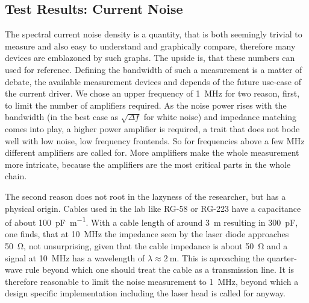 \clearpage
\subsection{Test Results: Current Noise}
\label{sec:results_current_noise}
The spectral current noise density is a quantity, that is both seemingly trivial to measure and also easy to understand and graphically compare, therefore many devices are emblazoned by such graphs. The upside is, that these numbers can used for reference. Defining the bandwidth of such a measurement is a matter of debate, the available measurement devices and depends of the future use-case of the current driver. We chose an upper frequency of \qty{1}{\MHz} for two reason, first, to limit the number of amplifiers required. As the noise power rises with the bandwidth (in the best case as $\sqrt{\Delta f}$ for white noise) and impedance matching comes into play, a higher power amplifier is required, a trait that does not bode well with low noise, low frequency frontends. So for frequencies above a few \unit{\MHz} different amplifiers are called for. More amplifiers make the whole measurement more intricate, because the amplifiers are the most critical parts in the whole chain.

The second reason does not root in the lazyness of the researcher, but has a physical origin. Cables used in the lab like RG-58 or RG-223 have a capacitance of about \qty{100}{\pF \per \m}. With a cable length of around \qty{3}{\m} resulting in \qty{300}{\pF}, one finds, that at \qty{10}{\MHz} the impedance seen by the laser diode approaches \qty{50}{\ohm}, not unsurprising, given that the cable impedance is about \qty{50}{\ohm} and a signal at \qty{10}{\MHz} has a wavelength of $\lambda \approx \qty{2}{\m}$. This is aproaching the quarter-wave rule beyond which one should treat the cable as a transmission line. It is therefore reasonable to limit the noise measurement to \qty{1}{\MHz}, beyond which a design specific implementation including the laser head is called for anyway.

\clearpage

